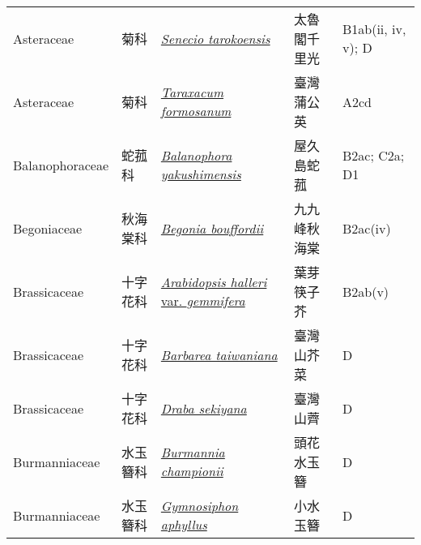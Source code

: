 {\begin{longtable}{L{2.5cm}L{2cm}L{5cm}L{2.5cm}L{3cm}}
    Asteraceae & 菊科 & \href{http://www.theplantlist.org/tpl1.1/search?q=Senecio+tarokoensis}{\textit{Senecio tarokoensis} } & 太魯閣千里光 & B1ab(ii, iv, v); D    \\
    Asteraceae & 菊科 & \href{http://www.theplantlist.org/tpl1.1/search?q=Taraxacum+formosanum}{\textit{Taraxacum formosanum} } & 臺灣蒲公英 & A2cd    \\
    Balanophoraceae & 蛇菰科 & \href{http://www.theplantlist.org/tpl1.1/search?q=Balanophora+yakushimensis}{\textit{Balanophora yakushimensis} } & 屋久島蛇菰 & B2ac; C2a; D1    \\
    Begoniaceae & 秋海棠科 & \href{http://www.theplantlist.org/tpl1.1/search?q=Begonia+bouffordii}{\textit{Begonia bouffordii} } & 九九峰秋海棠 & B2ac(iv)    \\
    Brassicaceae & 十字花科 & \href{http://www.theplantlist.org/tpl1.1/search?q=Arabidopsis+halleri+var.+gemmifera}{\textit{Arabidopsis halleri} var. \textit{gemmifera} } & 葉芽筷子芥 & B2ab(v)    \\
    Brassicaceae & 十字花科 & \href{http://www.theplantlist.org/tpl1.1/search?q=Barbarea+taiwaniana}{\textit{Barbarea taiwaniana} } & 臺灣山芥菜 & D    \\
    Brassicaceae & 十字花科 & \href{http://www.theplantlist.org/tpl1.1/search?q=Draba+sekiyana}{\textit{Draba sekiyana} } & 臺灣山薺 & D    \\
    Burmanniaceae & 水玉簪科 & \href{http://www.theplantlist.org/tpl1.1/search?q=Burmannia+championii}{\textit{Burmannia championii} } & 頭花水玉簪 & D    \\
    Burmanniaceae & 水玉簪科 & \href{http://www.theplantlist.org/tpl1.1/search?q=Gymnosiphon+aphyllus}{\textit{Gymnosiphon aphyllus} } & 小水玉簪 & D    \\

\end{longtable}}
